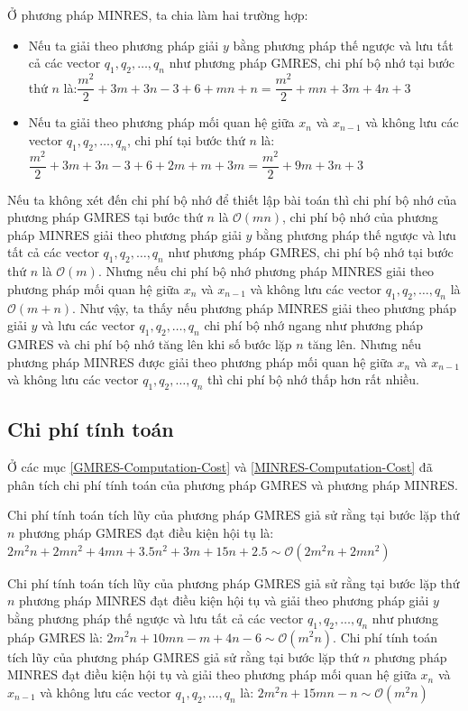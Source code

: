 \documentclass[14pt, a4paper]{article}
\numberwithin{equation}{section}
\numberwithin{algorithm}{section}
\numberwithin{figure}{section}
\numberwithin{dl}{section}
\numberwithin{md}{section}
\numberwithin{bd}{section}
\numberwithin{dn}{section}
\numberwithin{hq}{section}
\begin{document}
Ở phương pháp MINRES, ta chia làm hai trường hợp:

\begin{itemize}
    \item Nếu ta giải theo phương pháp giải $y$ bằng phương pháp thế ngược và lưu tất cả các vector $q_1, q_2, \dots, q_n$ như phương pháp GMRES, chi phí bộ nhớ tại bước thứ $n$ là:$\dfrac{m^2}{2}+3m + 3n-3+6+mn+n=\dfrac{m^2}{2}+mn+3m+4n+3$
    \item Nếu ta giải theo phương pháp mối quan hệ giữa $x_n$ và $x_{n-1}$ và không lưu các vector $q_1, q_2, \dots, q_n$, chi phí tại bước thứ $n$ là: $\dfrac{m^2}{2}+3m + 3n-3+6+2m + m + 3m=\dfrac{m^2}{2}+9m+3n+3$
\end{itemize}

Nếu ta không xét đến chi phí bộ nhớ để thiết lập bài toán thì chi phí bộ nhớ của phương pháp GMRES tại bước thứ $n$ là $\mathcal{O}(mn)$, chi phí bộ nhớ của phương pháp MINRES giải theo phương pháp giải $y$ bằng phương pháp thế ngược và lưu tất cả các vector $q_1, q_2, \dots, q_n$ như phương pháp GMRES, chi phí bộ nhớ tại bước thứ $n$ là $\mathcal{O}(m)$. Nhưng nếu chi phí bộ nhớ phương pháp MINRES giải theo phương pháp mối quan hệ giữa $x_n$ và $x_{n-1}$ và không lưu các vector $q_1, q_2, \dots, q_n$ là $\mathcal{O}(m+n)$. Như vậy, ta thấy nếu phương pháp MINRES giải theo phương pháp giải $y$ và lưu các vector $q_1, q_2, \dots, q_n$ chi phí bộ nhớ ngang như phương pháp GMRES và chi phí bộ nhớ tăng lên khi số bước lặp $n$ tăng lên.
Nhưng nếu phương pháp MINRES được giải theo phương pháp mối quan hệ giữa $x_n$ và $x_{n-1}$ và không lưu các vector $q_1, q_2, \dots, q_n$ thì chi phí bộ nhớ thấp hơn rất nhiều.

\subsection{Chi phí tính toán}

Ở các mục \ref{GMRES-Computation-Cost} và \ref{MINRES-Computation-Cost} đã phân tích chi phí tính toán của phương pháp GMRES và phương pháp MINRES.

Chi phí tính toán tích lũy của phương pháp GMRES giả sử rằng tại bước lặp thứ $n$ phương pháp GMRES đạt điều kiện hội tụ là: $2m^2 n + 2mn^2+4mn+3.5n^2+3m+15n+2.5 \sim \mathcal{O}(2m^2n+ 2mn^2)$

Chi phí tính toán tích lũy của phương pháp GMRES giả sử rằng tại bước lặp thứ $n$ phương pháp MINRES đạt điều kiện hội tụ và giải theo phương pháp giải $y$ bằng phương pháp thế ngược và lưu tất cả các vector $q_1, q_2, \dots, q_n$ như phương pháp GMRES là: $2m^2n+10mn-m+4n-6 \sim \mathcal{O}(m^2n)$.
Chi phí tính toán tích lũy của phương pháp GMRES giả sử rằng tại bước lặp thứ $n$ phương pháp MINRES đạt điều kiện hội tụ và giải theo phương pháp mối quan hệ giữa $x_n$ và $x_{n-1}$ và không lưu các vector $q_1, q_2, \dots, q_n$ là: $2m^2n+15mn-n \sim \mathcal{O}(m^2n)$
\end{document}
